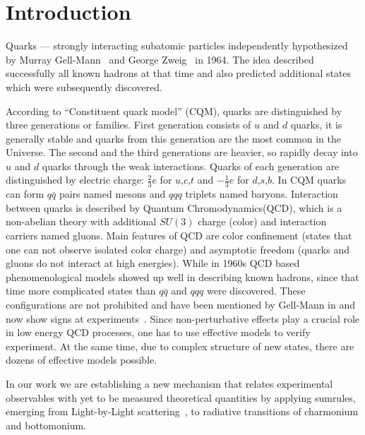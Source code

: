\chapter{Introduction}
Quarks --- strongly interacting subatomic particles independently hypothesized by Murray Gell-Mann~\cite{gellmann-quarks} and George Zweig~\cite{zweig-quarks} in 1964. The idea described successfully all known hadrons at that time and also predicted additional states which were subsequently discovered.

According to ``Constituent quark model'' (CQM), quarks are distinguished by three generations or families. First generation consists of $u$ and $d$ quarks, it is generally stable and quarks from this generation are the most common in the Universe. The second and the third generations are heavier, so rapidly decay into $u$ and $d$ quarks through the weak interactions. Quarks of each generation are distinguished by electric charge: $\frac{2}{3}e$ for $u$,$c$,$t$ and $-\frac{1}{3}e$ for $d$,$s$,$b$. In CQM quarks can form $q \bar{q}$ pairs named mesons and $qqq$ triplets named baryons. Interaction between quarks is described by Quantum Chromodynamics(QCD), which is a non-abelian theory with additional $SU(3)$ charge (color) and  interaction carriers named gluons. Main features of QCD are color confinement (states that one can not observe isolated color charge) and asymptotic freedom (quarks and gluons do not interact at high energies).
While in 1960s QCD based phenomenological models showed up well in describing known hadrons, since that time more complicated states than $q\bar{q}$ and $qqq$ were discovered. These configurations are not prohibited and have been mentioned by Gell-Mann in \cite{gellmann-quarks} and now show signs at experiments~\cite{Xbabar,Xbelle,Ybabar}. Since non-perturbative effects play a crucial role in low energy QCD processes, one has to use effective models to verify experiment. At the same time, due to complex structure of new states, there are dozens of effective models possible.

In our work we are establishing a new mechanism that relates experimental observables with yet to be measured theoretical quantities by applying sumrules, emerging from Light-by-Light scattering~\cite{lbl-sum1,lbl-sum2}, to radiative transitions of charmonium and bottomonium.


